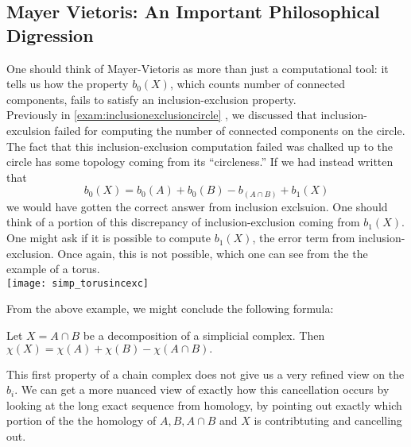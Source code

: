 \begin{doubledpage}
\subsection*{Mayer Vietoris: An Important Philosophical Digression}
One should think of Mayer-Vietoris as more than just a computational tool: it tells us how the property $b_0(X)$, which counts number of connected components, fails to satisfy an inclusion-exclusion property. \\
Previously in \ref{exam:inclusionexclusioncircle} , we discussed that inclusion-exculsion failed for computing the number of connected components on the circle. The fact that this inclusion-exclusion computation failed was chalked up to the circle has some topology coming from its ``circleness.'' If we had instead written that 
\[b_0(X) = b_0(A)+b_0(B)-b_(A\cap B) +b_1(X)\]
we would have gotten the correct answer from inclusion exclsuion. One should think of a portion of this discrepancy of inclusion-exclusion coming from  $b_1(X)$. \\
One might ask if it is possible to compute $b_1(X)$, the error term from inclusion-exclusion. Once again, this is not possible, which one can see from the the example of a torus. \\

 {\texttt{[image: simp\_torusincexc]}}

From the above example, we might conclude the following formula:
\begin{claim}
Let $X=A\cap B$ be a decomposition of a simplicial complex. Then $\chi(X)=\chi(A)+\chi(B)-\chi(A\cap B). $
\end{claim}
This first property of a chain complex does not give us a very refined view on the $b_i$. We can get a more nuanced view of exactly how this cancellation occurs by looking at the long exact sequence from homology, by pointing out exactly which portion of the the homology of $A, B, A\cap B$ and $X$ is contribtuting and cancelling out. 
\end{doubledpage}
